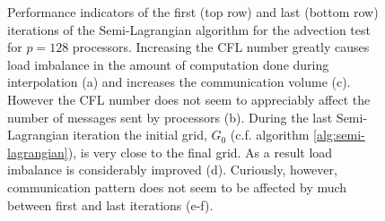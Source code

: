 \begin{figure}[htbp]
\begin{center}
	\end{center}
	\caption{Performance indicators of the first (top row) and last (bottom row) iterations of the Semi-Lagrangian algorithm for the advection test for $p=128$ processors. Increasing the CFL number greatly causes load imbalance in the amount of computation done during interpolation (a) and increases the communication volume (c). However the CFL number does not seem to appreciably affect the number of messages sent by processors (b). During the last Semi-Lagrangian iteration the initial grid, $G_0$ (c.f. algorithm \ref{alg:semi-lagrangian}), is very close to the final grid. As a result load imbalance is considerably improved (d). Curiously, however, communication pattern does not seem to be affected by much between first and last iterations (e-f).}
	\label{fig:communication_128}
\end{figure}

